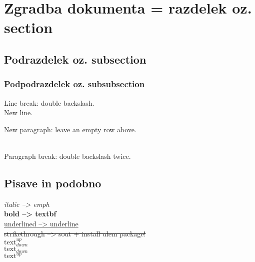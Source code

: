 \documentclass[a4paper]{article}
\begin{document}

\section{Zgradba dokumenta = razdelek oz. section}
\subsection{Podrazdelek oz. subsection}
\subsubsection{Podpodrazdelek oz. subsubsection}

Line break: double backslash. \\
New line.


New paragraph: leave an empty row above. \\
\begin {raggedright}
\\ Paragraph break: double backslash twice.
\end{raggedright}


\subsection{Pisave in podobno}
\emph{italic --> emph} \\ 
\textbf{bold --> textbf} \\ 
\underline{underlined --> underline} \\ 
\sout{strikethrough --> sout + install ulem package!} \\ 
$\text{text}_{down}^{up}$ \\
$\text{text}_{down}$ \\ 
$\text{text}^{up}$ \\ 
\end{document}
